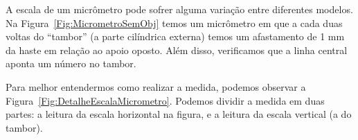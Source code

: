 A escala de um micrômetro pode sofrer alguma variação entre diferentes modelos. Na Figura~\ref{Fig:MicrometroSemObj} temos um micrômetro em que a cada duas voltas do ``tambor'' (a parte cilíndrica externa) temos um afastamento de 1 mm da haste em relação ao apoio oposto. Além disso, verificamos que a linha central aponta um número no tambor.

Para melhor entendermos como realizar a medida, podemos observar a Figura~\ref{Fig:DetalheEscalaMicrometro}. Podemos dividir a medida em duas partes: a leitura da escala horizontal na figura, e a leitura da escala vertical (a do tambor).

\begin{figure}
\centering
{}
\end{figure}
